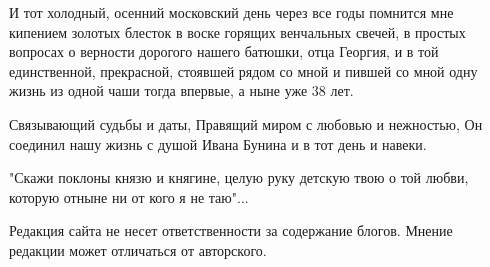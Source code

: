 И тот холодный, осенний московский день через все годы помнится мне кипением
золотых блесток в воске горящих венчальных свечей, в простых вопросах о
верности дорогого нашего батюшки, отца Георгия, и в той единственной,
прекрасной, стоявшей рядом со мной и пившей со мной одну жизнь из одной чаши
тогда впервые, а ныне уже 38 лет.

Связывающий судьбы и даты, Правящий миром с любовью и нежностью, Он соединил
нашу жизнь с душой Ивана Бунина и в тот день и навеки.

"Скажи поклоны князю и княгине, целую руку детскую твою о той любви, которую
отныне ни от кого я не таю"...

Редакция сайта не несет ответственности за содержание блогов. Мнение редакции
может отличаться от авторского.
